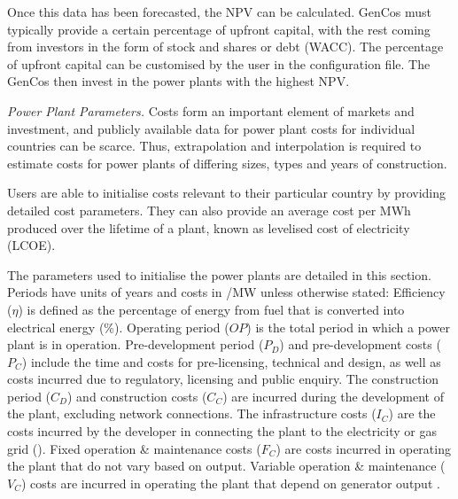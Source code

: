 Once this data has been forecasted\vphantom{Once expected fuel prices, carbon price, discount rate, and expected sale price of electricity are all forecast}, the NPV can be calculated. GenCos must typically provide a certain percentage of upfront capital, with the rest coming from investors in the form of stock and shares or debt (WACC). The percentage of upfront capital can be customised by the user in the configuration file. The GenCos then invest in the power plants with the highest NPV. 


\textit{Power Plant Parameters.}\label{ssssec:powerplantparameters} Costs form an important element of markets and investment, and publicly available data for power plant costs for individual countries can be scarce. Thus, extrapolation and interpolation is required to estimate costs for power plants of differing sizes, types and years of construction.

Users are able to initialise costs relevant to their particular country by providing detailed cost parameters. They can also provide an average cost per MWh produced over the lifetime of a plant, known as levelised cost of electricity (LCOE).

The parameters used to initialise the power plants are detailed in this section. Periods have units of years and costs in \textsterling/MW unless otherwise stated: Efficiency ($\eta$) is defined as the percentage of energy from fuel that is converted into electrical energy (\%). Operating period ($OP$) is the total period in which a power plant is in operation. Pre-development period ($P_D$) and pre-development costs ($P_C$) include the time and costs for pre-licensing, technical and design, as well as costs incurred due to regulatory, licensing and public enquiry. The construction period ($C_D$) and construction costs ($C_C$) are incurred during the development of the plant, excluding network connections. The infrastructure costs ($I_C$) are the costs incurred by the developer in connecting the plant to the electricity or gas grid (\textsterling). Fixed operation \& maintenance costs ($F_C$) are costs incurred in operating the plant that do not vary based on output. Variable operation \& maintenance ($V_C$) costs are incurred in operating the plant that depend on generator output \cite{Ltd2016}.




